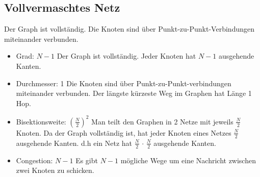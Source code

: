 \subsection{Vollvermaschtes Netz}
Der Graph ist vollständig. Die Knoten sind über Punkt-zu-Punkt-Verbindungen miteinander verbunden.
\begin{itemize}
  \item Grad: $N-1$
  \newline Der Graph ist vollständig. Jeder Knoten hat $N-1$ ausgehende Kanten.
  \item Durchmesser: 1
   \newline Die Knoten sind über Punkt-zu-Punkt-verbindungen miteinander verbunden. Der längste kürzeste Weg  im Graphen hat Länge 1 Hop.
  \item Bisektionsweite: $ \left( \frac{N}{2}\right)^2$
  \newline Man teilt den Graphen in 2 Netze mit jeweils $\frac{N}{2}$ Knoten. Da der Graph vollständig ist, hat jeder Knoten eines Netzes  $\frac{N}{2}$ ausgehende Kanten. d.h ein Netz hat $\frac{N}{2} \, \cdot \, \frac{N}{2}$ ausgehende Kanten. 
  \item Congestion: $N-1$
  \newline Es gibt $N-1$ mögliche Wege um eine Nachricht zwischen zwei Knoten zu schicken.
\end{itemize}


